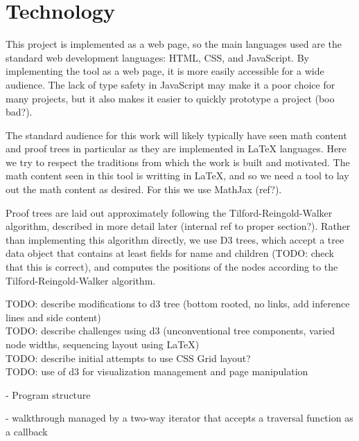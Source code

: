 \documentclass[conference]{IEEEtran}
\begin{document}
\section{Technology}

This project is implemented as a web page, so the main languages used are the standard web development languages: HTML, CSS, and JavaScript. By implementing the tool as a web page, it is more easily accessible for a wide audience. The lack of type safety in JavaScript may make it a poor choice for many projects, but it also makes it easier to quickly prototype a project (boo bad?).

The standard audience for this work will likely typically have seen math content and proof trees in particular as they are implemented in \LaTeX{} languages. Here we try to respect the traditions from which the work is built and motivated. The math content seen in this tool is writting in \LaTeX{}, and so we need a tool to lay out the math content as desired. For this we use MathJax (ref?).

Proof trees are laid out approximately following the Tilford-Reingold-Walker algorithm, described in more detail later (internal ref to proper section?). Rather than implementing this algorithm directly, we use D3 trees, which accept a tree data object that contains at least fields for name and children (TODO: check that this is correct), and computes the positions of the nodes according to the Tilford-Reingold-Walker algorithm.

TODO: describe modifications to d3 tree (bottom rooted, no links, add inference lines and side content) \\

TODO: describe challenges using d3 (unconventional tree components, varied node widths, sequencing layout using \LaTeX{}) \\

TODO: describe initial attempts to use CSS Grid layout? \\

TODO: use of d3 for visualization management and page manipulation


- Program structure

- walkthrough managed by a two-way iterator that accepts a traversal function as a callback
\end{document}
